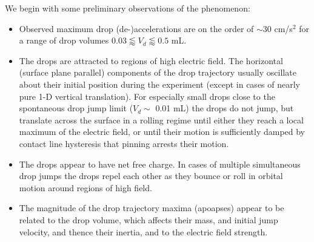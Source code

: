 \documentclass[12pt,a4paper,oneside]{book}
\begin{document}
We begin with some preliminary observations of the phenomenon:
\begin{itemize}
\item Observed maximum drop (de-)accelerations are on the order of $\sim$30 cm/s$^2$ for a range of drop volumes $0.03 \lessapprox V_d \lessapprox 0.5$ mL.
\item The drops are attracted to regions of high electric field. The horizontal (surface plane parallel) components of the drop trajectory usually oscillate about their initial position during the experiment (except in cases of nearly pure 1-D vertical translation). For especially small drops close to the spontaneous drop jump limit ($V_d \sim$ 0.01 mL) the drops do not jump, but translate across the surface in a rolling regime until either they reach a local maximum of the electric field, or until their motion is sufficiently damped by contact line hysteresis that pinning arrests their motion.
\item The drops appear to have net free charge. In cases of multiple simultaneous drop jumps the drops repel each other as they bounce or roll in orbital motion around regions of high field.
\item The magnitude of the drop trajectory maxima (apoapses) appear to be related to the drop volume, which affects their mass, and initial jump velocity, and thence their inertia, and to the electric field strength.
\end{itemize}
\end{document}

